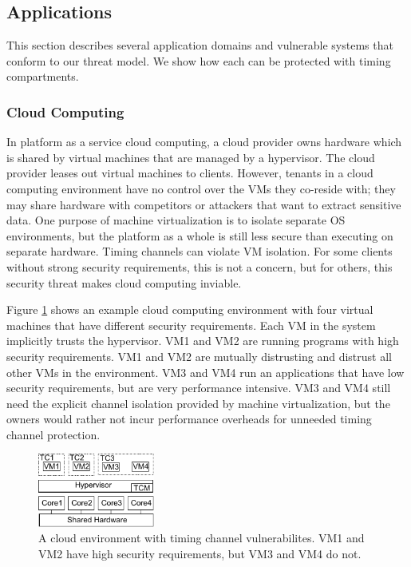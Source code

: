 \subsection{Applications}
This section describes several application domains and vulnerable systems that 
conform to our threat model. We show how each can be protected with timing 
compartments.
\subsubsection{Cloud Computing}
In platform as a service cloud computing, a cloud provider owns hardware which 
is shared by virtual machines that are managed by a hypervisor. The cloud 
provider leases out virtual machines to clients. However, tenants in a cloud 
computing environment have no control over the VMs they co-reside with; they 
may share hardware with competitors or attackers that want to extract sensitive
data. One purpose of machine virtualization is to isolate separate OS 
environments, but the platform as a whole is still less secure than executing 
on separate hardware. Timing channels can violate VM isolation. For some 
clients without strong security requirements, this is not a concern, but for 
others, this security threat makes cloud computing inviable.

Figure \ref{fig:cloud_tcs} shows an example cloud computing environment with 
four virtual machines that have different security requirements. Each VM in the 
system implicitly trusts the hypervisor. VM1 and VM2 are running programs with 
high security requirements. VM1 and VM2 are mutually distrusting and distrust 
all other VMs in the environment.  VM3 and VM4 run an applications that have 
low security requirements, but are very performance intensive. VM3 and VM4 
still need the explicit channel isolation provided by machine virtualization, 
but the owners would rather not incur performance overheads for unneeded timing 
channel protection.

\begin{figure}
    \begin{center}
        \includegraphics[width=1.51in]{figs/cloud_tcs.pdf}
        \caption{A cloud environment with timing channel vulnerabilites.  VM1 
        and VM2 have high security requirements, but VM3 and VM4 do not.}
        \label{fig:cloud_tcs}
    \end{center}
\end{figure}


